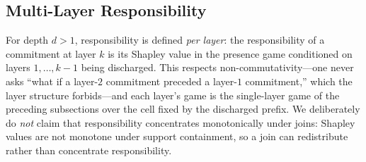 \subsection{Multi-Layer Responsibility}
\label{app:multi-layer-resp}

For depth $d > 1$, responsibility is defined \emph{per layer}: the
responsibility of a commitment at layer $k$ is its Shapley value in the
presence game conditioned on layers $1, \dots, k{-}1$ being discharged. This
respects non-commutativity---one never asks ``what if a layer-$2$ commitment
preceded a layer-$1$ commitment,'' which the layer structure forbids---and
each layer's game is the single-layer game of the preceding subsections over
the cell fixed by the discharged prefix. We deliberately do \emph{not} claim
that responsibility concentrates monotonically under joins: Shapley values are
not monotone under support containment, so a join can redistribute rather than
concentrate responsibility.
